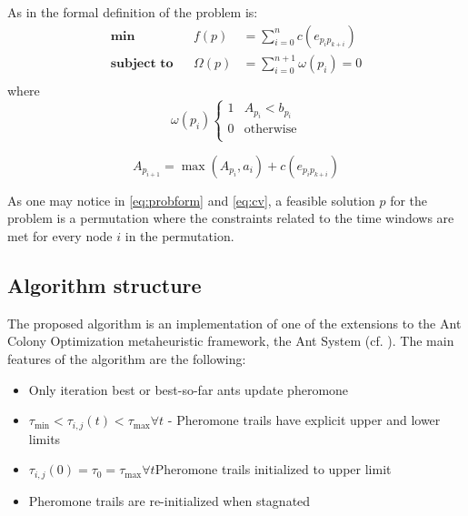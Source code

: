 \begin{homeworkProblem}
As in \cite{lopez2010beam} the formal definition of the problem is:
\begin{align} \label{eq:probform}
 \textbf{min} & &f(p) &= \sum\limits_{i=0}^{n} c(e_{p_{i}p_{k+i}}) \\
 \textbf{subject to} & &\Omega(p) &= \sum\limits_{i=0}^{n+1} \omega(p_{i}) = 0 \\
\end{align}
where
\begin{equation} \label{eq:cv}
 \omega(p_{i}) \begin{cases}
 1 & A_{p_i} < b_{p_i}  \\
 0 & \text{otherwise} \\   
  \end{cases}
\end{equation}

\begin{equation} \label{eq:at}
A_{p_{i+1}} = \max(A_{p_i},a_i) + c(e_{p_{i}p_{k+i}})  
\end{equation}

As one may notice in \ref{eq:probform} and \ref{eq:cv}, a feasible solution $p$ for the problem is a permutation where the constraints related to the time windows are met for every node $i$ in the permutation.

\subsection{Algorithm structure}
The proposed algorithm is an implementation of one of the extensions to the Ant Colony Optimization metaheuristic framework, the \maxmin Ant System (cf. \cite{stutzle2000max}).
The main features of the algorithm are the following:
\begin{itemize}
  \item Only iteration best or best-so-far ants update pheromone
  \item $\tau_{\min} < \tau_{i,j}(t) < \tau_{\max} \forall t $ - Pheromone trails have explicit upper and lower limits
  \item $\tau_{i,j}(0) = \tau_0 = \tau_{\max} \forall t $Pheromone trails initialized to upper limit
  \item Pheromone trails are re-initialized when stagnated
\end{itemize}


\end{homeworkProblem}
